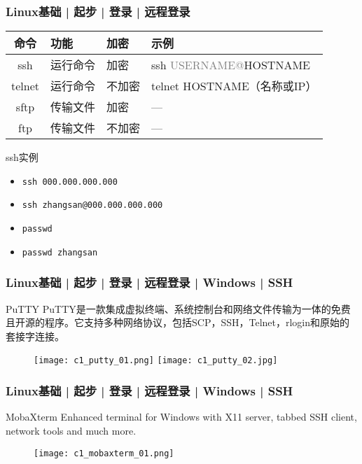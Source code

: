 \begin{frame}[fragile]
  \frametitle{Linux基础 | 起步 | 登录 | 远程登录}
  \begin{table}
    \centering
    \begin{tabular}{clll}
      \hline
      \rowcolor{blue!50}命令 & 功能 & 加密 & 示例\\
      \hline
      \alert{ssh} & 运行命令 & 加密 & ssh \textcolor{gray}{USERNAME@}HOSTNAME\\
      telnet & 运行命令 & 不加密 & telnet HOSTNAME（名称或IP）\\
      sftp & 传输文件 & 加密 & ---\\
      ftp & 传输文件 & 不加密 & ---\\
      \hline
    \end{tabular}
  \end{table}
  \pause
  \begin{block}{ssh实例}
    \begin{itemize}
      \item \verb|ssh 000.000.000.000|
      \item \verb|ssh zhangsan@000.000.000.000|
      \item \verb|passwd|
      \item \verb|passwd zhangsan|
    \end{itemize}
  \end{block}
\end{frame}

\begin{frame}
  \frametitle{Linux基础 | 起步 | 登录 | 远程登录 | Windows | SSH}
  \begin{block}{PuTTY}
    PuTTY是一款集成虚拟终端、系统控制台和网络文件传输为一体的免费且开源的程序。它支持多种网络协议，包括SCP，SSH，Telnet，rlogin和原始的套接字连接。\\
  \end{block}
  \begin{figure}
    \centering
    \texttt{[image: c1\_putty\_01.png]}
    \texttt{[image: c1\_putty\_02.jpg]}
  \end{figure}
\end{frame}

\begin{frame}
  \frametitle{Linux基础 | 起步 | 登录 | 远程登录 | Windows | SSH}
  \begin{block}{MobaXterm}
    Enhanced terminal for Windows with X11 server, tabbed SSH client, network tools and much more.
  \end{block}
  \begin{figure}
    \centering
    \texttt{[image: c1\_mobaxterm\_01.png]}
  \end{figure}
\end{frame}

